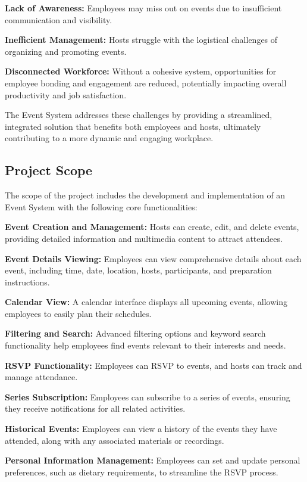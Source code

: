 \documentclass[a4paper,12pt]{article}
\begin{document}
\textbf{Lack of Awareness:} Employees may miss out on events due to insufficient communication and visibility.

\textbf{Inefficient Management:} Hosts struggle with the logistical challenges of organizing and promoting events.

\textbf{Disconnected Workforce:} Without a cohesive system, opportunities for employee bonding and engagement are 
reduced, potentially impacting overall productivity and job satisfaction.

The Event System addresses these challenges by providing a streamlined, integrated solution that 
benefits both employees and hosts, ultimately contributing to a more dynamic and engaging workplace.

\subsection{Project Scope}
The scope of the project includes the development and implementation of an Event System with the following core functionalities:

\textbf{Event Creation and Management:} Hosts can create, edit, and delete events, providing 
detailed information and multimedia content to attract attendees.

\textbf{Event Details Viewing:} Employees can view comprehensive details about each event, 
including time, date, location, hosts, participants, and preparation instructions.

\textbf{Calendar View:} A calendar interface displays all upcoming events, allowing employees 
to easily plan their schedules.

\textbf{Filtering and Search:} Advanced filtering options and keyword search functionality 
help employees find events relevant to their interests and needs.

\textbf{RSVP Functionality:} Employees can RSVP to events, and hosts can track and manage attendance.

\textbf{Series Subscription:} Employees can subscribe to a series of events, ensuring they 
receive notifications for all related activities.

\textbf{Historical Events:} Employees can view a history of the events they have attended, 
along with any associated materials or recordings.

\textbf{Personal Information Management:} Employees can set and update personal preferences, 
such as dietary requirements, to streamline the RSVP process.
\end{document}
